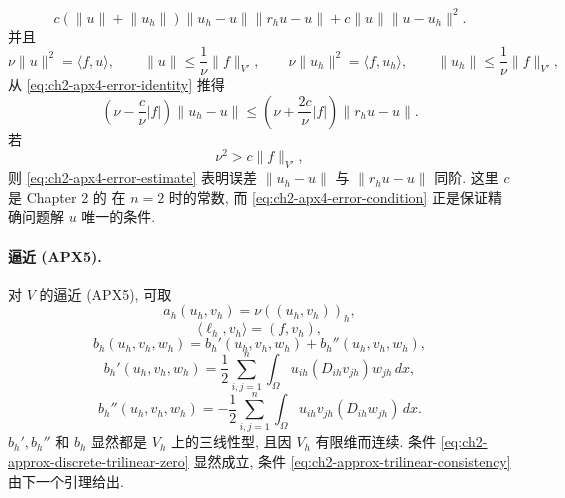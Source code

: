 \[
c(\lVert u\rVert+\lVert u_h\rVert)\lVert u_h-u\rVert\lVert r_hu-u\rVert
+c\lVert u\rVert\lVert u-u_h\rVert^2.
\]
并且
\[
\nu\lVert u\rVert^2=\langle f,u\rangle,
\qquad
\lVert u\rVert\leq\frac1\nu\lVert f\rVert_{V'},
\qquad
\nu\lVert u_h\rVert^2=\langle f,u_h\rangle,
\qquad
\lVert u_h\rVert\leq\frac1\nu\lVert f\rVert_{V'},
\]
从 \eqref{eq:ch2-apx4-error-identity} 推得
\begin{equation}
\left(\nu-\frac c\nu|f|\right)\lVert u_h-u\rVert
\leq\left(\nu+\frac{2c}\nu|f|\right)\lVert r_hu-u\rVert.
\label{eq:ch2-apx4-error-estimate}
\end{equation}
若
\begin{equation}
\nu^2>c\lVert f\rVert_{V'},
\label{eq:ch2-apx4-error-condition}
\end{equation}
则 \eqref{eq:ch2-apx4-error-estimate} 表明误差 $\lVert u_h-u\rVert$ 与 $\lVert r_hu-u\rVert$ 同阶. 这里 $c$ 是 Chapter 2 的  在 $n=2$ 时的常数, 而 \eqref{eq:ch2-apx4-error-condition} 正是保证精确问题解 $u$ 唯一的条件.

\hypertarget{chapter-02-page-159}{}
\paragraph{逼近 (APX5).}
对 $V$ 的逼近 (APX5), 可取
\begin{equation}
a_h(u_h,v_h)=\nu((u_h,v_h))_h,
\label{eq:ch2-apx5-bilinear-form}
\end{equation}
\begin{equation}
\langle\ell_h,v_h\rangle=(f,v_h),
\label{eq:ch2-apx5-load-form}
\end{equation}
\begin{equation}
b_h(u_h,v_h,w_h)=b_h'(u_h,v_h,w_h)+b_h''(u_h,v_h,w_h),
\label{eq:ch2-apx5-trilinear-form}
\end{equation}
\begin{equation}
b_h'(u_h,v_h,w_h)
=\frac12\sum_{i,j=1}^{n}\int_\Omega u_{ih}(D_{ih}v_{jh})w_{jh}\,dx,
\label{eq:ch2-apx5-trilinear-first-part}
\end{equation}
\begin{equation}
b_h''(u_h,v_h,w_h)
=-\frac12\sum_{i,j=1}^{n}\int_\Omega u_{ih}v_{jh}(D_{ih}w_{jh})\,dx.
\label{eq:ch2-apx5-trilinear-second-part}
\end{equation}
$b_h',b_h''$ 和 $b_h$ 显然都是 $V_h$ 上的三线性型, 且因 $V_h$ 有限维而连续. 条件 \eqref{eq:ch2-approx-discrete-trilinear-zero} 显然成立, 条件 \eqref{eq:ch2-approx-trilinear-consistency} 由下一个引理给出.

